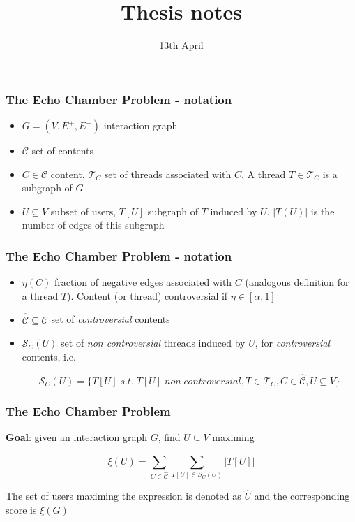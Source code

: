 \documentclass{beamer}
\title{Thesis notes}
\date{13th April}
\begin{document}
\frame{\titlepage}

\begin{frame}[c]
	\frametitle{The Echo Chamber Problem - notation}
	\begin{itemize}
		\item $G = (V, E ^{+}, E ^{-}) $ interaction graph
		\item $ \mathcal{C} $ set of contents
		\item $C \in \mathcal{C} $ content, $\mathcal{T} _{C} $ set of threads
		      associated with $C$. A thread $T \in \mathcal{T} _{C} $ is a
		      subgraph of $G$
		\item $U \subseteq V$ subset of users, $T[U]$ subgraph of $T$ induced
		      by $U$. $|T(U)|$ is the number of edges of this subgraph
	\end{itemize}
\end{frame}

\begin{frame}[c]
	\frametitle{The Echo Chamber Problem - notation}
	\begin{itemize}
		\item $\eta(C)$ fraction of negative edges associated with $C$
		      (analogous definition for a thread $T$). Content (or thread)
		      controversial if $\eta \in [\alpha, 1]$
		\item $\hat{\mathcal{C} } \subseteq \mathcal{C} $ set of \textit{controversial}
		      contents

		\item $\mathcal{S} _C (U)$ set of \textit{non controversial} threads
		      induced by $U$, for \textit{controversial} contents, i.e.

			      {\small
				      \begin{equation}
					      \mathcal{S} _{C} (U) = \{ T[U] \; s.t. \; T[U] \; non \;
					      controversial, T \in \mathcal{T} _{C}, C
					      \in \hat{\mathcal{C}}, U \subseteq V\}
				      \end{equation}
			      }
	\end{itemize}

\end{frame}

\begin{frame}[c]
	\frametitle{The Echo Chamber Problem}
	\textbf{Goal}: given an interaction graph $G$, find $U \subseteq V$ maximing

	\begin{equation}
		\xi (U) = \sum^{}_{C \in \hat{\mathcal{C}} } \sum^{}_{T[U] \in S_C (U)}
		| T[U] |
	\end{equation}

	The set of users maximing the expression is denoted as $\hat{U}$ and the
	corresponding score is $\xi(G)$
\end{frame}
\end{document}
